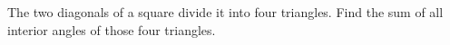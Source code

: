 The two diagonals of a square divide it into four triangles. Find the sum of all interior angles of those four triangles.
